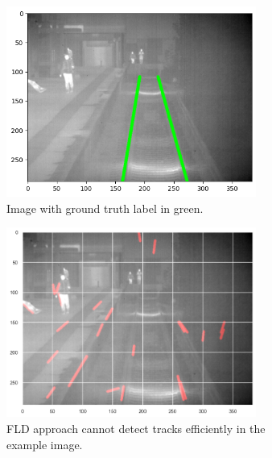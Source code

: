 \documentclass[Master,MDS,english]{BASE/twbook} %
\begin{document}
\begin{figure}[H]
\centering
\begin{subfigure}[t]{.33\textwidth}
  \centering
  \includegraphics[width=0.9\textwidth]{images/results/example_4_gt}
  \caption{Image with ground truth label in green.}
\end{subfigure}%
\begin{subfigure}[t]{.33\textwidth}
  \centering
  \includegraphics[width=0.9\textwidth]{images/results/example_4_fld}
  \caption{FLD approach cannot detect tracks efficiently in the example image.}
\end{subfigure}%
\begin{subfigure}[t]{.33\textwidth}
  \centering

\end{subfigure}
\end{figure}
\end{document}
